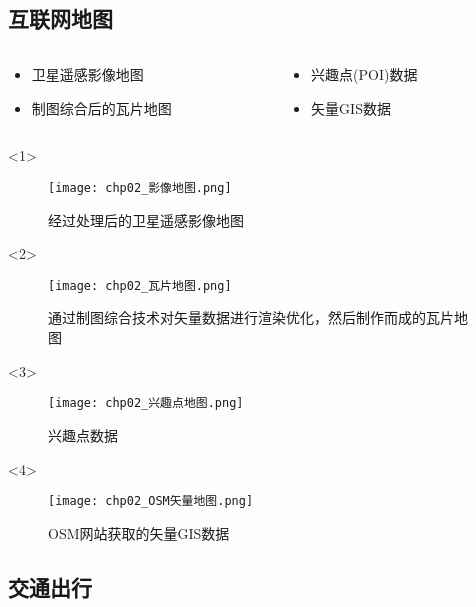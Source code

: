 \subsection{互联网地图}
\begin{frame}[t]{\subsecname}
  \begin{columns}[T]
     \begin{column}[T]{0.5\textwidth}
     \begin{itemize}
        \item<1-> 卫星遥感影像地图
        \item<2-> 制图综合后的瓦片地图
     \end{itemize} \end{column}

     \begin{column}[T]{0.5\textwidth}
     \begin{itemize}
        \item<3-> 兴趣点(POI)数据
        \item<4-> 矢量GIS数据
     \end{itemize} \end{column}
  \end{columns}

\begin{overlayarea}{\textwidth}{\textheight}
  \begin{onlyenv}<1>
\begin{figure}
  \centering
  \texttt{[image: chp02\_影像地图.png]}
  \caption{经过处理后的卫星遥感影像地图}
\end{figure}
  \end{onlyenv}

\vspace{-10pt}
  \begin{onlyenv}<2>
\begin{figure}
  \centering
  \texttt{[image: chp02\_瓦片地图.png]}
  \caption{通过制图综合技术对矢量数据进行渲染优化，然后制作而成的瓦片地图}
\end{figure}
  \end{onlyenv}

  \begin{onlyenv}<3>
\begin{figure}
  \centering
  \texttt{[image: chp02\_兴趣点地图.png]}
  \caption{兴趣点数据}
\end{figure}
  \end{onlyenv}

  \begin{onlyenv}<4>
\begin{figure}
  \centering
  \texttt{[image: chp02\_OSM矢量地图.png]}
  \caption{OSM网站获取的矢量GIS数据}
\end{figure}
  \end{onlyenv}
\end{overlayarea}

\end{frame}

\subsection{交通出行}

